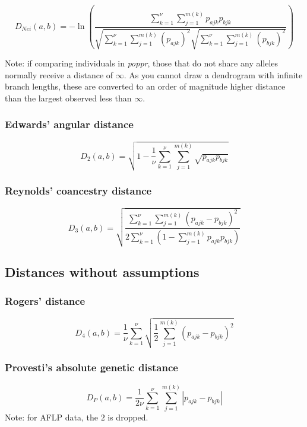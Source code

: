 \documentclass[letterpaper]{article}\usepackage[]{graphicx}\usepackage[]{color}
\newcommand{\poppr}{\textit{poppr}}
\begin{document}
\begin{equation}
  D_{Nei}(a,b)= -\ln(\frac{\sum_{k=1}^{\nu} \sum_{j=1}^{m(k)}
  p_{ajk} p_{bjk}}{\sqrt{\sum_{k=1}^{\nu} \sum_{j=1}^{m(k)}
  {(p_{ajk}) }^2}\sqrt{\sum_{k=1}^{\nu} \sum_{j=1}^{m(k)}
  {(p_{bjk})}^2}})
\end{equation}

Note: if comparing individuals in \poppr{}, those that do not share any alleles
normally receive a distance of $\infty$. As you cannot draw a dendrogram with 
infinite branch lengths, these are converted to an order of magnitude higher
distance than the largest observed less than $\infty$.

\subsubsection{Edwards' angular distance}
\label{distance:edwards}
\begin{equation}
  D_2(a,b)=\sqrt{1-\frac{1}{\nu} \sum_{k=1}^{\nu}
  \sum_{j=1}^{m(k)} \sqrt{p_{ajk}  p_{bjk}}}
\end{equation}

\subsubsection{Reynolds' coancestry distance}
\label{distance:reynolds}
\begin{equation}
  D_3(a,b)=\sqrt{\frac{\sum_{k=1}^{\nu}
  \sum_{j=1}^{m(k)}{(p_{ajk} - p_{bjk})}^2}{2 \sum_{k=1}^{\nu} (1-
  \sum_{j=1}^{m(k)}p_{ajk} p_{bjk})}}
\end{equation}

\subsection{Distances without assumptions}
\subsubsection{Rogers' distance}
\label{distance:rogers}
\begin{equation}
  D_4(a,b)=\frac{1}{\nu} \sum_{k=1}^{\nu} \sqrt{\frac{1}{2}
  \sum_{j=1}^{m(k)}{(p_{ajk} - p_{bjk})}^2}
\end{equation}


\subsubsection{Provesti's absolute genetic distance}
\label{distance:provesti}
\begin{equation}
  D_{P}(a,b)=\frac{1}{2{\nu}} \sum_{k=1}^{\nu} \sum_{j=1}^{m(k)}
  |p_{ajk} - p_{bjk}|
\end{equation}
Note: for AFLP data, the $2$ is dropped. 
\end{document}
